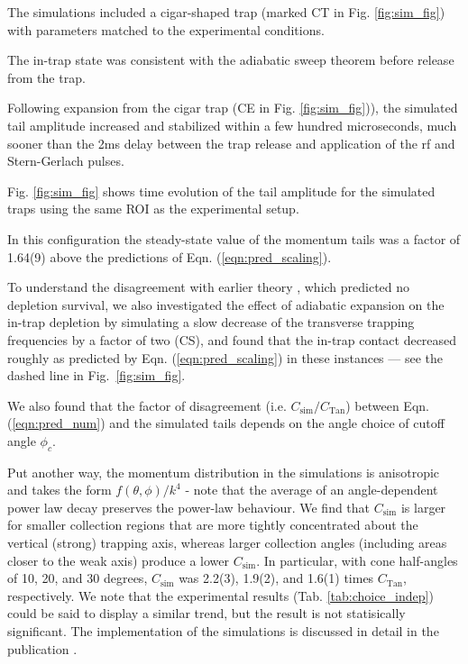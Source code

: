 	The simulations included a cigar-shaped trap (marked CT in Fig.
	\ref{fig:sim_fig}) with parameters matched to the experimental conditions.
	
	The in-trap state was consistent with the adiabatic sweep theorem before release from the trap.
	
	Following expansion from the cigar trap (CE in Fig.
	\ref{fig:sim_fig})), the simulated tail amplitude increased and stabilized within a few hundred microseconds, much sooner than the 2ms delay between the trap release and application of the rf and Stern-Gerlach pulses.
	
	Fig.
	\ref{fig:sim_fig} shows time evolution of the tail amplitude for the simulated traps using the same ROI as the experimental setup.
	 
	In this configuration the steady-state value of the momentum tails was a factor of 1.64(9) above the predictions of Eqn.
	(\ref{eqn:pred_scaling}).
	

	To understand the disagreement with earlier theory \cite{Qu16}, which predicted no depletion survival, we also investigated the effect of adiabatic expansion on the in-trap depletion by simulating a slow decrease of the transverse trapping frequencies by a factor of two (CS), and found that the in-trap contact decreased roughly as predicted by Eqn.
	(\ref{eqn:pred_scaling}) in these instances --- see the dashed line in Fig.~\ref{fig:sim_fig}.
	
	We also found that the factor of disagreement (i.e.
	$C_\textrm{sim}/C_\textrm{Tan}$) between Eqn.
	(\ref{eqn:pred_num}) and the simulated tails depends on the angle choice of cutoff angle $\phi_c$.
	
	Put another way, the momentum distribution in the simulations is anisotropic and takes the form $f(\theta,\phi)/k^4$ - note that the average of an angle-dependent power law decay preserves the power-law behaviour.
	We find that $C_\textrm{sim}$ is larger for smaller collection regions that are more tightly concentrated about the vertical (strong) trapping axis, whereas larger collection angles (including areas closer to the weak axis) produce a lower $C_\textrm{sim}$.
	In particular, with cone half-angles of 10, 20, and 30 degrees, $C_\textrm{sim}$ was 2.2(3), 1.9(2), and 1.6(1) times $C_\textrm{Tan}$, respectively.
	We note that the experimental results (Tab.
	\ref{tab:choice_indep}) could be said to display a similar trend, but the result is not statisically significant.
	The implementation of the simulations is discussed in detail in the publication \cite{Ross21}.


